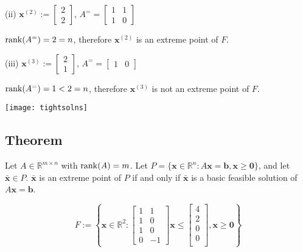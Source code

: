 (ii)
$\bm{x}^{(2)}:=\begin{bmatrix}2\\2\end{bmatrix}$,
$ A^= =
\begin{bmatrix}
    1 & 1\\
    1 & 0
\end{bmatrix} $

$ \operatorname{rank}(A^=)=2=n $, therefore $\bm{x}^{(2)}$ is an extreme
point of $ F $.

(iii)
$\bm{x}^{(3)}:=\begin{bmatrix}2\\1\end{bmatrix}$,
$ A^= =
\begin{bmatrix}
    1 & 0
\end{bmatrix} $

$ \operatorname{rank}(A^=)=1<2=n $, therefore $\bm{x}^{(3)}$ is not an extreme
point of $ F $.

\begin{center}
    \texttt{[image: tightsolns]}
\end{center}

\begin{thmbox}
    \subsection{Theorem}
    Let $ A\in\mathbb{R}^{m\times n} $ with $ \operatorname{rank}(A)=m $. 
    Let $ P=\{\bm{x}\in\mathbb{R}^n: A \bm{x}=\bm{b},
    \bm{x}\ge \bm{0}\} $, and let $ \bm{\bar{x}}\in P $.
    $ \bm{\bar{x}} $ is an extreme point of $ P $ if and only if $ \bm{\bar{x}} $ is a basic feasible solution of $  A \bm{x}=\bm{b} $.
\end{thmbox}

\[ F:=\left\{ \bm{x}\in\mathbb{R}^2: \begin{bmatrix}
    1 & 1\\
    1 & 0\\
    1 & 0\\
    0 & -1
\end{bmatrix}\bm{x}\le
\begin{bmatrix}
    4\\
    2\\
    0\\
    0\\
\end{bmatrix}, \bm{x}\ge \bm{0} \right\} \]

